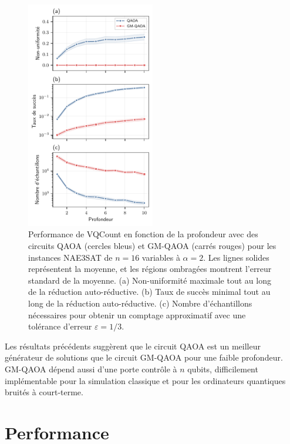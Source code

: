 \begin{figure}[H]
    \centering
    \includegraphics[width=0.5\textwidth]{figures/nae3sat-depth.pdf}
    \caption[Impact de la profondeur du circuit pour \#NAE3SAT]{Performance de VQCount en fonction de la profondeur avec des circuits QAOA (cercles bleus) et GM-QAOA (carrés rouges) pour les instances NAE3SAT de $n=16$ variables à $\alpha=2$. Les lignes solides représentent la moyenne, et les régions ombragées montrent l'erreur standard de la moyenne. (a) Non-uniformité maximale tout au long de la réduction auto-réductive. (b) Taux de succès minimal tout au long de la réduction auto-réductive. (c) Nombre d'échantillons nécessaires pour obtenir un comptage approximatif avec une tolérance d'erreur $\varepsilon = 1/3$.}
    \label{fig:nae3sat-depth}
\end{figure}

Les résultats précédents suggèrent que le circuit QAOA est un meilleur générateur de solutions que le circuit GM-QAOA pour une faible profondeur. GM-QAOA dépend aussi d'une porte contrôle à $n$ qubits, difficilement implémentable pour la simulation classique et pour les ordinateurs quantiques bruités à court-terme. 


\section{Performance}
\label{sec:performance}

